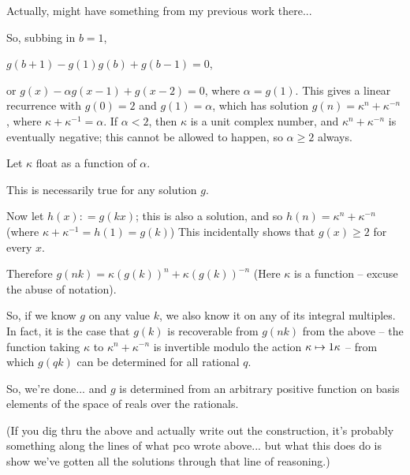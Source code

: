 \begin{solution}
	Actually, might have something from my previous work there... 

So, subbing in $ b = 1$,

$ g(b+1) - g(1)g(b) + g(b-1) = 0$,

or $ g(x) - \alpha g(x-1) + g(x-2) = 0$, where $ \alpha = g(1)$. This gives a linear recurrence
with $ g(0) = 2$ and $ g(1) = \alpha$, which has solution $ g(n) = \kappa^n + \kappa^{-n}$, where
$ \kappa + \kappa^{-1} = \alpha$. If $ \alpha < 2$, then $ \kappa$ is a unit complex number, and $ \kappa^n + \kappa^{-n}$ is eventually negative; this cannot be allowed to happen, so $ \alpha \ge 2$ always.

 Let $ \kappa$ float as a function of $ \alpha$.

 This is necessarily true for any solution $ g$. 

Now let $ h(x) : = g(kx)$; this is also a solution, and so $ h(n) = \kappa^n + \kappa^{-n}$ (where
$ \kappa + \kappa^{-1} = h(1) = g(k)$) This incidentally shows that $ g(x) \ge 2$ for every $ x$.

Therefore $ g(nk) = \kappa(g(k))^n + \kappa(g(k))^{-n}$ (Here $ \kappa$ is a function -- excuse
the abuse of notation).

So, if we know $ g$ on any value $ k$, we also know it on any of its integral multiples. In fact, it is the case that $ g(k)$ is recoverable from $ g(nk)$ from the above -- the function taking $ \kappa$ to $ \kappa^n + \kappa^{-n}$ is invertible modulo the action $ \kappa \mapsto 1\/\kappa$ -- from which $ g(qk)$ can be determined for all rational $ q$. 

So, we're done... and $ g$ is determined from an arbitrary positive function on basis elements of the space of reals over the rationals. 

(If you dig thru the above and actually write out the construction, it's probably something along the lines of what pco wrote above... but what this does do is show we've gotten all the solutions through that line of reasoning.)
\end{solution}



